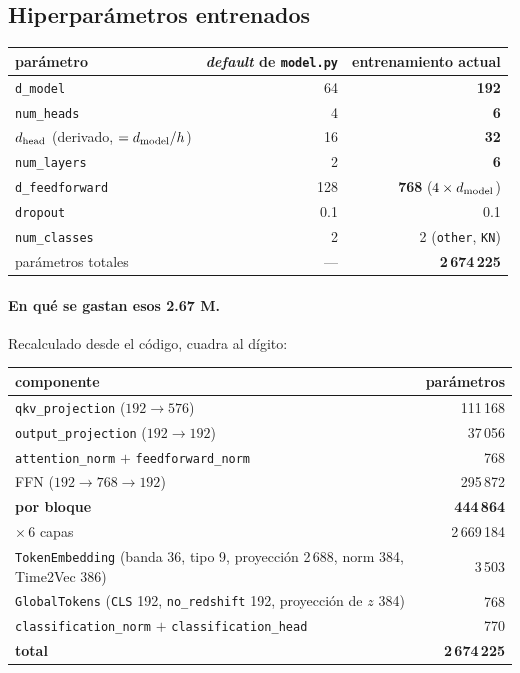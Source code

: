 \documentclass[11pt,a4paper]{article}
\newcommand{\code}[1]{\texttt{\small #1}}
\begin{document}
\subsection{Hiperparámetros entrenados}
\begin{center}
\begin{tabular}{lrr}
\toprule
parámetro & \emph{default} de \code{model.py} & \textbf{entrenamiento actual} \\
\midrule
\code{d\_model} & 64 & \textbf{192} \\
\code{num\_heads} & 4 & \textbf{6} \\
$d_{\rm head}$ (derivado, $=d_{\rm model}/h$) & 16 & \textbf{32} \\
\code{num\_layers} & 2 & \textbf{6} \\
\code{d\_feedforward} & 128 & \textbf{768} ($4\times d_{\rm model}$) \\
\code{dropout} & 0.1 & 0.1 \\
\code{num\_classes} & 2 & 2 (\code{other}, \code{KN}) \\
\midrule
parámetros totales & --- & \textbf{2\,674\,225} \\
\bottomrule
\end{tabular}
\end{center}

\paragraph{En qué se gastan esos 2.67 M.} Recalculado desde el código, cuadra al dígito:

\begin{center}
\begin{tabular}{lr}
\toprule
componente & parámetros \\
\midrule
\code{qkv\_projection} ($192\to576$) & 111\,168 \\
\code{output\_projection} ($192\to192$) & 37\,056 \\
\code{attention\_norm} $+$ \code{feedforward\_norm} & 768 \\
FFN ($192\to768\to192$) & 295\,872 \\
\midrule
\textbf{por bloque} & \textbf{444\,864} \\
$\times\,6$ capas & 2\,669\,184 \\
\code{TokenEmbedding} (banda 36, tipo 9, proyección 2\,688, norm 384, Time2Vec 386) & 3\,503 \\
\code{GlobalTokens} (\code{CLS} 192, \code{no\_redshift} 192, proyección de $z$ 384) & 768 \\
\code{classification\_norm} $+$ \code{classification\_head} & 770 \\
\midrule
\textbf{total} & \textbf{2\,674\,225} \\
\bottomrule
\end{tabular}
\end{center}
\end{document}

